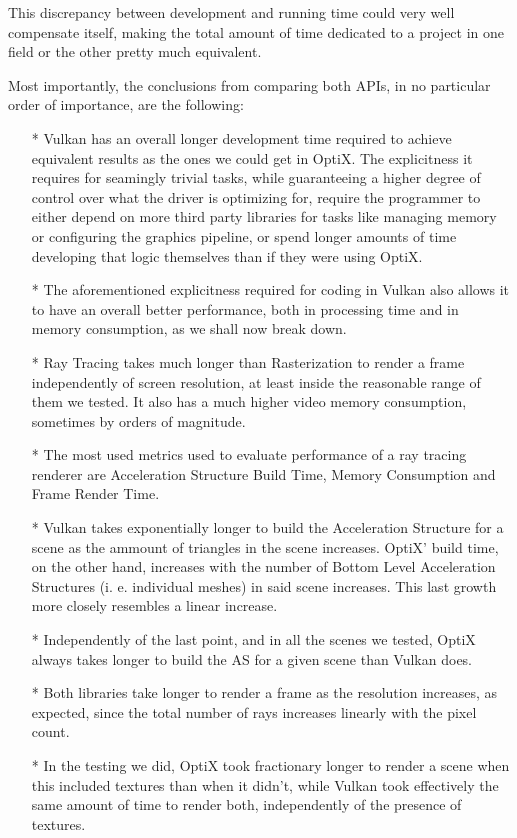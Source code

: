 This discrepancy between development and running time could very well compensate itself, making the total amount of time dedicated to a project in one field or the other pretty much equivalent.

Most importantly, the conclusions from comparing both APIs, in no particular order of importance, are the following:
\begin{itemize}
  \item[*]{Vulkan has an overall longer development time required to achieve equivalent results as the ones we could get in OptiX. The explicitness it requires for seamingly trivial tasks, while guaranteeing a higher degree of control over what the driver is optimizing for, require the programmer to either depend on more third party libraries for tasks like managing memory or configuring the graphics pipeline, or spend longer amounts of time developing that logic themselves than if they were using OptiX.}
  \item[*]{The aforementioned explicitness required for coding in Vulkan also allows it to have an overall better performance, both in processing time and in memory consumption, as we shall now break down.}
  \item[*]{Ray Tracing takes much longer than Rasterization to render a frame independently of screen resolution, at least inside the reasonable range of them we tested. It also has a much higher video memory consumption, sometimes by orders of magnitude.}
  \item[*]{The most used metrics used to evaluate performance of a ray tracing renderer are Acceleration Structure Build Time, Memory Consumption and Frame Render Time.}
  \item[*]{Vulkan takes exponentially longer to build the Acceleration Structure for a scene as the ammount of triangles in the scene increases. OptiX' build time, on the other hand, increases with the number of Bottom Level Acceleration Structures (i. e. individual meshes) in said scene increases. This last growth more closely resembles a linear increase.}
  \item[*]{Independently of the last point, and in all the scenes we tested, OptiX always takes longer to build the AS for a given scene than Vulkan does.}
  \item[*]{Both libraries take longer to render a frame as the resolution increases, as expected, since the total number of rays increases linearly with the pixel count.}
  \item[*]{In the testing we did, OptiX took fractionary longer to render a scene when this included textures than when it didn't, while Vulkan took effectively the same amount of time to render both, independently of the presence of textures.}

\end{itemize}
